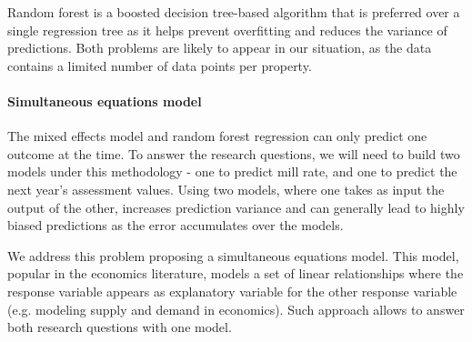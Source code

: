 \documentclass{article}
\begin{document}
Random forest is a boosted decision tree-based algorithm that is preferred over a single regression tree as it helps prevent overfitting and reduces the variance of predictions. Both problems are likely to appear in our situation, as the data contains a limited number of data points per property.

\paragraph{Simultaneous equations model}
The mixed effects model and random forest regression can only predict one outcome at the time.  To answer the research questions, we will need to build two models under this methodology - one to predict mill rate, and one to predict the next year's assessment values. Using two models, where one takes as input the output of the other, increases prediction variance and can generally lead to highly biased predictions as the error accumulates over the models.

We address this problem proposing a simultaneous equations model. This model, popular in the economics literature, models a set of linear relationships where the response variable appears as explanatory variable for the other response variable (e.g. modeling supply and demand in economics). Such approach allows to answer both research questions with one model.



\end{document}
